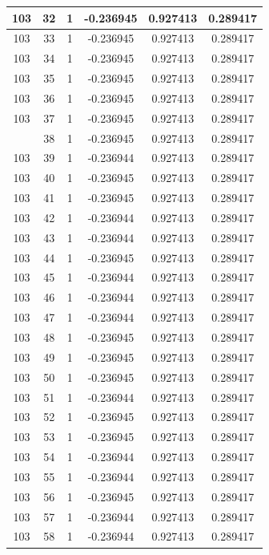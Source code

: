 \documentclass[12pt,a4paper]{article}
\numberwithin{equation}{section}
\numberwithin{figure}{section}
\numberwithin{table}{section}
\begin{document}
\begin{longtable}{|c|c|c|c|c|c|}
103 & 32 & 1 & -0.236945 & 0.927413 & 0.289417 \\ \hline
103 & 33 & 1 & -0.236945 & 0.927413 & 0.289417 \\ \hline
103 & 34 & 1 & -0.236945 & 0.927413 & 0.289417 \\ \hline
103 & 35 & 1 & -0.236945 & 0.927413 & 0.289417 \\ \hline
103 & 36 & 1 & -0.236945 & 0.927413 & 0.289417 \\ \hline
103 & 37 & 1 & -0.236945 & 0.927413 & 0.289417 \\ \hline
\pagebreak
103 & 38 & 1 & -0.236945 & 0.927413 & 0.289417 \\ \hline
103 & 39 & 1 & -0.236944 & 0.927413 & 0.289417 \\ \hline
103 & 40 & 1 & -0.236945 & 0.927413 & 0.289417 \\ \hline
103 & 41 & 1 & -0.236945 & 0.927413 & 0.289417 \\ \hline
103 & 42 & 1 & -0.236944 & 0.927413 & 0.289417 \\ \hline
103 & 43 & 1 & -0.236944 & 0.927413 & 0.289417 \\ \hline
103 & 44 & 1 & -0.236945 & 0.927413 & 0.289417 \\ \hline
103 & 45 & 1 & -0.236944 & 0.927413 & 0.289417 \\ \hline
103 & 46 & 1 & -0.236944 & 0.927413 & 0.289417 \\ \hline
103 & 47 & 1 & -0.236944 & 0.927413 & 0.289417 \\ \hline
103 & 48 & 1 & -0.236945 & 0.927413 & 0.289417 \\ \hline
103 & 49 & 1 & -0.236945 & 0.927413 & 0.289417 \\ \hline
103 & 50 & 1 & -0.236945 & 0.927413 & 0.289417 \\ \hline
103 & 51 & 1 & -0.236944 & 0.927413 & 0.289417 \\ \hline
103 & 52 & 1 & -0.236945 & 0.927413 & 0.289417 \\ \hline
103 & 53 & 1 & -0.236945 & 0.927413 & 0.289417 \\ \hline
103 & 54 & 1 & -0.236944 & 0.927413 & 0.289417 \\ \hline
103 & 55 & 1 & -0.236944 & 0.927413 & 0.289417 \\ \hline
103 & 56 & 1 & -0.236945 & 0.927413 & 0.289417 \\ \hline
103 & 57 & 1 & -0.236944 & 0.927413 & 0.289417 \\ \hline
103 & 58 & 1 & -0.236944 & 0.927413 & 0.289417 \\ \hline

\end{longtable}
\end{document}
